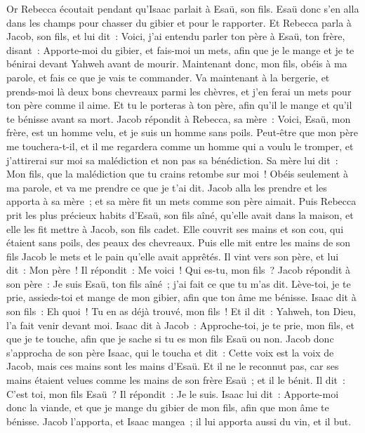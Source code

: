 \begin{multicols}{2}
Or Rebecca écoutait pendant qu'Isaac parlait à Esaü, son fils. Esaü donc s'en alla dans les champs pour chasser du gibier et pour le rapporter.
Et Rebecca parla à Jacob, son fils, et lui dit~: Voici, j'ai entendu parler ton père à Esaü, ton frère, disant~:
Apporte-moi du gibier, et fais-moi un mets, afin que je le mange et je te bénirai devant Yahweh avant de mourir.
Maintenant donc, mon fils, obéis à ma parole, et fais ce que je vais te commander.
Va maintenant à la bergerie, et prends-moi là deux bons chevreaux parmi les chèvres, et j'en ferai un mets pour ton père comme il aime.
Et tu le porteras à ton père, afin qu'il le mange et qu'il te bénisse avant sa mort.
Jacob répondit à Rebecca, sa mère~: Voici, Esaü, mon frère, est un homme velu, et je suis un homme sans poils.
Peut-être que mon père me touchera-t-il, et il me regardera comme un homme qui a voulu le tromper, et j'attirerai sur moi sa malédiction et non pas sa bénédiction.
Sa mère lui dit~: Mon fils, que la malédiction que tu crains retombe sur moi~! Obéis seulement à ma parole, et va me prendre ce que je t'ai dit.
Jacob alla les prendre et les apporta à sa mère~; et sa mère fit un mets comme son père aimait.
Puis Rebecca prit les plus précieux habits d'Esaü, son fils aîné, qu'elle avait dans la maison, et elle les fit mettre à Jacob, son fils cadet.
Elle couvrit ses mains et son cou, qui étaient sans poils, des peaux des chevreaux.
Puis elle mit entre les mains de son fils Jacob le mets et le pain qu'elle avait apprêtés.
Il vint vers son père, et lui dit~: Mon père~! Il répondit~: Me voici~! Qui es-tu, mon fils~?
Jacob répondit à son père~: Je suis Esaü, ton fils aîné~; j'ai fait ce que tu m'as dit. Lève-toi, je te prie, assieds-toi et mange de mon gibier, afin que ton âme me bénisse.
Isaac dit à son fils~: Eh quoi~! Tu en as déjà trouvé, mon fils~! Et il dit~: Yahweh, ton Dieu, l'a fait venir devant moi.
Isaac dit à Jacob~: Approche-toi, je te prie, mon fils, et que je te touche, afin que je sache si tu es mon fils Esaü ou non.
Jacob donc s'approcha de son père Isaac, qui le toucha et dit~: Cette voix est la voix de Jacob, mais ces mains sont les mains d'Esaü.
Et il ne le reconnut pas, car ses mains étaient velues comme les mains de son frère Esaü~; et il le bénit.
Il dit~: C'est toi, mon fils Esaü~? Il répondit~: Je le suis.
Isaac lui dit~: Apporte-moi donc la viande, et que je mange du gibier de mon fils, afin que mon âme te bénisse. Jacob l'apporta, et Isaac mangea~; il lui apporta aussi du vin, et il but.

\end{multicols}
